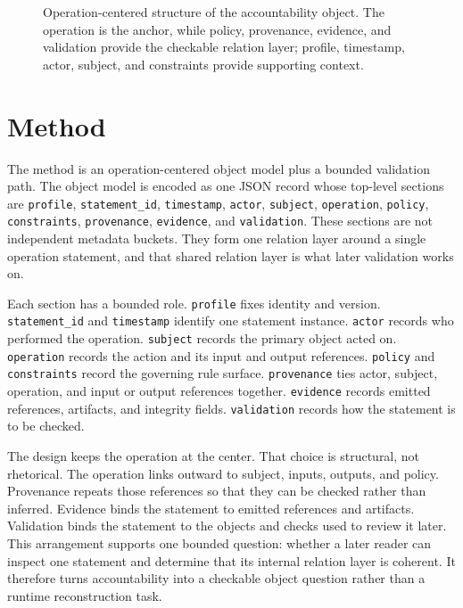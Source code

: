 \documentclass[conference]{IEEEtran}
\begin{document}
\begin{figure}[t]
\centering
{}
\caption{Operation-centered structure of the accountability object. The operation is the anchor, while policy, provenance, evidence, and validation provide the checkable relation layer; profile, timestamp, actor, subject, and constraints provide supporting context.}
\label{fig:profile}
\end{figure}

\section{Method}

The method is an operation-centered object model plus a bounded validation path. The object model is encoded as one JSON record whose top-level sections are \texttt{profile}, \texttt{statement\_id}, \texttt{timestamp}, \texttt{actor}, \texttt{subject}, \texttt{operation}, \texttt{policy}, \texttt{constraints}, \texttt{provenance}, \texttt{evidence}, and \texttt{validation}. These sections are not independent metadata buckets. They form one relation layer around a single operation statement, and that shared relation layer is what later validation works on.

Each section has a bounded role. \texttt{profile} fixes identity and version. \texttt{statement\_id} and \texttt{timestamp} identify one statement instance. \texttt{actor} records who performed the operation. \texttt{subject} records the primary object acted on. \texttt{operation} records the action and its input and output references. \texttt{policy} and \texttt{constraints} record the governing rule surface. \texttt{provenance} ties actor, subject, operation, and input or output references together. \texttt{evidence} records emitted references, artifacts, and integrity fields. \texttt{validation} records how the statement is to be checked.

The design keeps the operation at the center. That choice is structural, not rhetorical. The operation links outward to subject, inputs, outputs, and policy. Provenance repeats those references so that they can be checked rather than inferred. Evidence binds the statement to emitted references and artifacts. Validation binds the statement to the objects and checks used to review it later. This arrangement supports one bounded question: whether a later reader can inspect one statement and determine that its internal relation layer is coherent. It therefore turns accountability into a checkable object question rather than a runtime reconstruction task.
\end{document}
